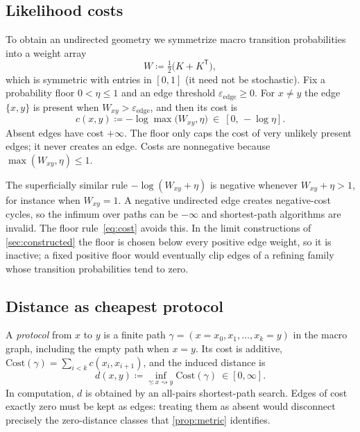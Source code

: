 \subsection{Likelihood costs}
\label{sec:costs}

To obtain an undirected geometry we symmetrize macro transition probabilities into a weight array
\begin{equation}
W\coloneqq \tfrac12\bigl(K+K^{\mathsf T}\bigr),
\end{equation}
which is symmetric with entries in $[0,1]$ (it need not be stochastic).
Fix a probability floor $0<\eta\le 1$ and an edge threshold $\varepsilon_{\mathrm{edge}}\ge 0$.
For $x\neq y$ the edge $\{x,y\}$ is present when $W_{xy}>\varepsilon_{\mathrm{edge}}$, and then its cost is
\begin{equation}
c(x,y)\coloneqq -\log\max\bigl(W_{xy},\eta\bigr)\ \in\ [0,\,-\log\eta].
\label{eq:cost}
\end{equation}
Absent edges have cost $+\infty$.
The floor only caps the cost of very unlikely present edges; it never creates an edge.
Costs are nonnegative because $\max(W_{xy},\eta)\le 1$.

\begin{remark}
The superficially similar rule $-\log(W_{xy}+\eta)$ is negative whenever $W_{xy}+\eta>1$, for instance when $W_{xy}=1$.
A negative undirected edge creates negative-cost cycles, so the infimum over paths can be $-\infty$ and shortest-path algorithms are invalid.
The floor rule~\eqref{eq:cost} avoids this.
In the limit constructions of \cref{sec:constructed} the floor is chosen below every positive edge weight, so it is inactive; a fixed positive floor would eventually clip edges of a refining family whose transition probabilities tend to zero.
\end{remark}

\subsection{Distance as cheapest protocol}

A \emph{protocol} from $x$ to $y$ is a finite path $\gamma=(x=x_0,x_1,\dots,x_k=y)$ in the macro graph, including the empty path when $x=y$.
Its cost is additive, $\mathrm{Cost}(\gamma)=\sum_{i<k}c(x_i,x_{i+1})$, and the induced distance is
\begin{equation}
d(x,y)\coloneqq \inf_{\gamma\colon x\rightsquigarrow y}\mathrm{Cost}(\gamma)\ \in[0,\infty].
\label{eq:path-metric}
\end{equation}
In computation, $d$ is obtained by an all-pairs shortest-path search.
Edges of cost exactly zero must be kept as edges: treating them as absent would disconnect precisely the zero-distance classes that \cref{prop:metric} identifies.

